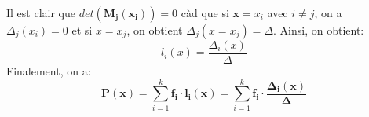 \documentclass[a4paper,12pt]{article}
\begin{document}
Il est clair que $det(\mathbf{M_j(x_i)})=0$ càd que si $\mathbf{x}= x_i$ avec $i \neq j$, on a $\Delta_j(x_i)=0$ et si $x= x_j$, on obtient $\Delta_j(x=x_j)= \Delta$. Ainsi, on obtient:
\begin{equation}
	l_i(x)= \frac{\Delta_i(x)}{\Delta}
\end{equation}
Finalement, on a:
\begin{equation}
	\mathbf{P(x)}= \sum_{i=1}^{k} \mathbf{f_i \cdot l_i(x)} = \sum_{i=1}^{k} \mathbf{f_i \cdot \frac{\Delta_i(x)}{\Delta} }
\end{equation}
\end{document}
